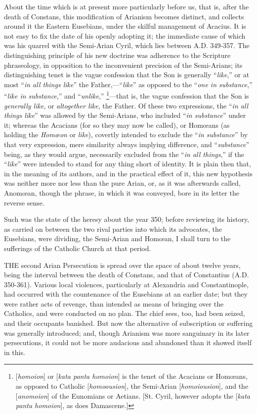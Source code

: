 About the time which is at present more particularly before us,
that is, after the death of Constans, this modification of Arianism
becomes distinct, and collects around it the Eastern Eusebians, under
the skilful management of Acacius. It is not easy to fix the date of
his openly adopting it; the immediate cause of which was his quarrel
with the Semi-Arian Cyril, which lies between A.D.
349-357. The distinguishing principle of his new doctrine was
adherence to the Scripture phraseology, in opposition to the
inconvenient precision of the Semi-Arians; its distinguishing tenet is
the vague confession that the Son is generally ``\emph{like},''
or at most ``\emph{in all things like}'' the Father,—``\emph{like}''
as opposed to the ``\emph{one in substance},'' ``\emph{like
in substance},'' and ``\emph{unlike},'' \footnote{[\emph{homoion}] or [\emph{kata panta homoion}]
is the tenet of the Acacians or Homœans, as opposed to Catholic [\emph{homoousion}],
the Semi-Arian [\emph{homoiousion}], and the [\emph{anomoion}] of the
Eunomians or Aetians. [St. Cyril, however adopts the [\emph{kata panta
homoion}], as does Damascene.]}—that is, the vague confession that the Son is \emph{generally
like}, or \emph{altogether like}, the Father. Of these two
expressions, the ``\emph{in all things like}'' was allowed by
the Semi-Arians, who included ``\emph{in substance}'' under
it; whereas the Acacians (for so they may now be called), or Homœans
(as holding the \emph{Homœon} or \emph{like}), covertly intended to
exclude the ``\emph{in substance}'' by that very expression,
mere similarity always implying difference, and ``\emph{substance}''
being, as they would argue, necessarily excluded from the ``\emph{in
all things},'' if the ``\emph{like}'' were intended to
stand for any thing short of identity. It is plain then that, in the
meaning of its authors, and in the practical effect of it, this new
hypothesis was neither more nor less than the pure Arian, or, as it
was afterwards called, Anomœan, though the phrase, in which it was
conveyed, bore in its letter the reverse sense.

Such was the state of the heresy about the year 350; before
reviewing its history, as carried on between the two rival parties
into which its advocates, the Eusebians, were dividing, the Semi-Arian
and Homœan, I shall turn to the sufferings of the Catholic Church at
that period.


THE second Arian Persecution is spread
over the space of about twelve years, being the interval between the
death of Constans, and that of Constantius (A.D.
350-361). Various local violences, particularly at Alexandria and
Constantinople, had occurred with the countenance of the Eusebians at
an earlier date; but they were rather acts of revenge, than intended
as means of bringing over the Catholics, and were conducted on no
plan. The chief sees, too, had been seized, and their occupants
banished. But now the alternative of subscription or suffering was
generally introduced; and, though Arianism was more sanguinary in its
later persecutions, it could not be more audacious and abandoned than
it showed itself in this.

